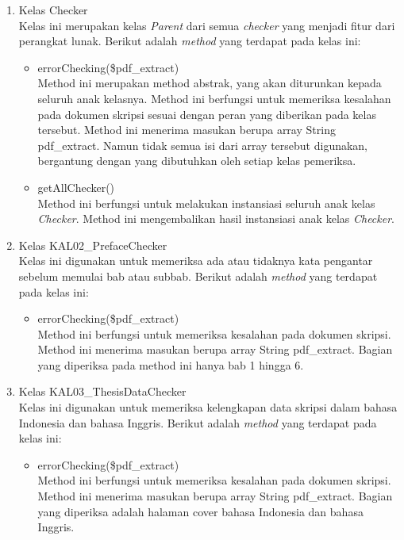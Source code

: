 \begin{enumerate}

	\item Kelas Checker \\
	Kelas ini merupakan kelas \textit{Parent} dari semua \textit{checker} yang menjadi fitur dari perangkat lunak. Berikut adalah \textit{method} yang terdapat pada kelas ini:
	
		\begin{itemize}
			\item errorChecking(\$pdf\_extract) \\
			Method ini merupakan method abstrak, yang akan diturunkan kepada seluruh anak kelasnya. Method ini berfungsi untuk memeriksa kesalahan pada dokumen skripsi sesuai dengan peran yang diberikan pada kelas tersebut. Method ini menerima masukan berupa array String pdf\_extract. Namun tidak semua isi dari array tersebut digunakan, bergantung dengan yang dibutuhkan oleh setiap kelas pemeriksa.			
			
			\item getAllChecker() \\
			Method ini berfungsi untuk melakukan instansiasi seluruh anak kelas \textit{Checker}. Method ini mengembalikan hasil instansiasi anak kelas \textit{Checker}.
		\end{itemize}
	
	\item Kelas KAL02\_PrefaceChecker \\
	Kelas ini digunakan untuk memeriksa ada atau tidaknya kata pengantar sebelum memulai bab atau subbab. Berikut adalah \textit{method} yang terdapat pada kelas ini:
	
		\begin{itemize}
			\item errorChecking(\$pdf\_extract) \\
			Method ini berfungsi untuk memeriksa kesalahan pada dokumen skripsi. Method ini menerima masukan berupa array String pdf\_extract. Bagian yang diperiksa pada method ini hanya bab 1 hingga 6.
		\end{itemize}
	
	\item Kelas KAL03\_ThesisDataChecker \\
	Kelas ini digunakan untuk memeriksa kelengkapan data skripsi dalam bahasa Indonesia dan bahasa Inggris. Berikut adalah \textit{method} yang terdapat pada kelas ini:
			
		\begin{itemize}
			\item errorChecking(\$pdf\_extract) \\
			Method ini berfungsi untuk memeriksa kesalahan pada dokumen skripsi. Method ini menerima masukan berupa array String pdf\_extract. Bagian yang diperiksa adalah halaman cover bahasa Indonesia dan bahasa Inggris.
		\end{itemize}
		

\end{enumerate}
